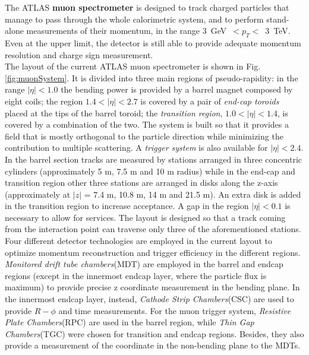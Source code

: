 \documentclass[a4paper,twoside,12pt]{book}
\begin{document}
The ATLAS \textbf{muon spectrometer} is designed to track charged particles that manage to pass through the whole calorimetric system, and to perform stand-alone measurements of their momentum, in the range 
\mbox{3 GeV $< p_{T} <$ 3 TeV}. Even at the upper limit, the detector is still able to provide adequate momentum resolution and charge sign measurement\cite{muon_tdr}\cite{Aad:2008zzm}.\\

The layout of the current  ATLAS muon spectrometer is shown in Fig.\ref{fig:muonSystem}. It is divided into three main regions of pseudo-rapidity: in the range $|\eta| < 1.0$ the bending power
is provided by a barrel magnet composed by eight coils; the region $1.4 < |\eta| < 2.7$ is covered by a pair of \textit{end-cap toroids} placed at the tips of the barrel toroid; the \textit{transition
region}, $1.0 < |\eta| < 1.4$, is covered by a combination of the two. The system is built so that it provides a field that is mostly orthogonal to the particle direction while minimizing the contribution to multiple scattering. A \textit{trigger system} is also available for $|\eta| < 2.4$. \\

In the barrel section tracks are measured by stations arranged in three concentric cylinders (approximately 5 m, 7.5 m and 10 m radius) while in the end-cap and
transition region other three stations are arranged in disks along the z-axis (approximately at  $|z|$ = 7.4 m, 10.8 m, 14 m and 21.5 m). An extra disk is added in the transition
region to increase acceptance. A gap in the region $|\eta| < 0.1$ is necessary to allow for services. The layout is designed so that a track coming from the interaction point can traverse only three of the aforementioned stations.\\

Four different detector technologies are employed in the current layout to optimize momentum reconstruction and trigger efficiency in the 
different regions.  \textit{Monitored drift tube chambers}(MDT) are employed in the barrel and endcap regions (except in the innermost endcap layer, where the particle flux is maximum) to provide precise z coordinate measurement in the bending plane. In the innermost endcap layer, instead, \textit{Cathode Strip Chambers}(CSC) are used to provide $R-\phi$ and time measurements. For the muon trigger system, \textit{Resistive Plate Chambers}(RPC) are used in the barrel region, while \textit{Thin Gap Chambers}(TGC) were chosen for transition and endcap
regions. Besides, they also provide a measurement of the coordinate in the non-bending plane to the MDTs. 
\end{document}
